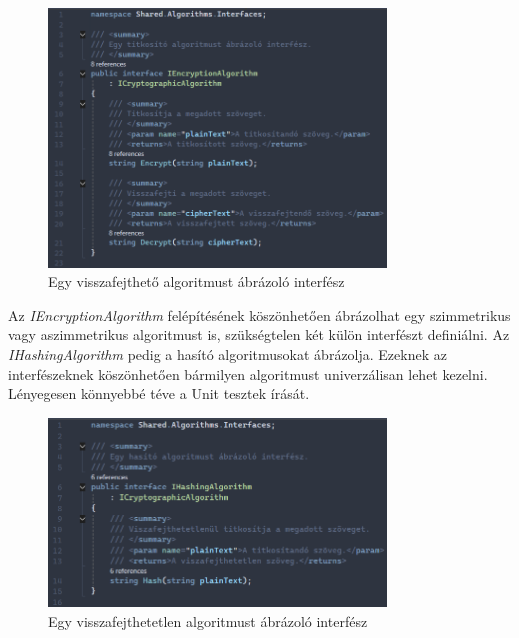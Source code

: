 \documentclass[12pt]{report} %
\begin{document}
\begin{figure}[H]
    \centering %
    \includegraphics[width=0.8\textwidth]{Figures/IEncryptionAlgorithm.png} %
    \caption{Egy visszafejthető algoritmust ábrázoló interfész} %
    \label{fig:IEncryptionAlgorithm} %
\end{figure}

Az \textit{IEncryptionAlgorithm} felépítésének köszönhetően ábrázolhat egy szimmetrikus vagy aszimmetrikus algoritmust is, szükségtelen két külön interfészt definiálni. Az \textit{IHashingAlgorithm} pedig a hasító algoritmusokat ábrázolja. Ezeknek az interfészeknek köszönhetően bármilyen algoritmust univerzálisan lehet kezelni. Lényegesen könnyebbé téve a Unit tesztek írását.

\begin{figure}[H]
    \centering %
    \includegraphics[width=0.8\textwidth]{Figures/IHashingAlgorithm.png} %
    \caption{Egy visszafejthetetlen algoritmust ábrázoló interfész} %
    \label{fig:IHashingAlgorithm} %
\end{figure}
\end{document}
